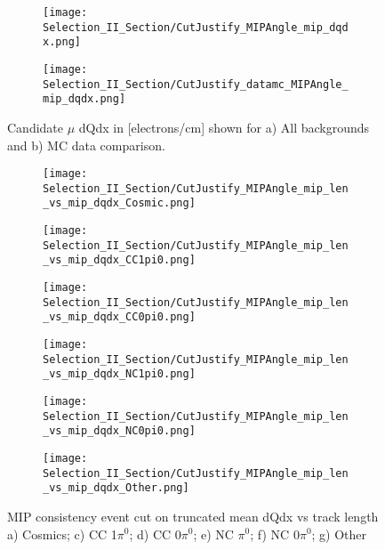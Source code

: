 \begin{figure}[h!]
\centering
  \begin{subfigure}[t]{0.3\textwidth}
    \centering
\texttt{[image: Selection\_II\_Section/CutJustify\_MIPAngle\_mip\_dqdx.png]}
    \caption{ }
  \end{subfigure} 
  \hspace{20mm}
  \begin{subfigure}[t]{0.3\textwidth}
    \centering
\texttt{[image: Selection\_II\_Section/CutJustify\_datamc\_MIPAngle\_mip\_dqdx.png]}
    \caption{ }
  \end{subfigure} 
\caption{ Candidate $\mu$ dQdx in [electrons/cm] shown for a) All backgrounds and b) MC data comparison. }
\label{fig:cutjust_sel2_multall_dqdx}
\end{figure}

\begin{figure}[t!]
\centering
  \begin{subfigure}[t]{0.35\textwidth}
    \centering
\texttt{[image: Selection\_II\_Section/CutJustify\_MIPAngle\_mip\_len\_vs\_mip\_dqdx\_Cosmic.png]}
    \caption{ }
  \end{subfigure} 
  \hspace{3mm}
  \begin{subfigure}[t]{0.35\textwidth}
    \centering
\texttt{[image: Selection\_II\_Section/CutJustify\_MIPAngle\_mip\_len\_vs\_mip\_dqdx\_CC1pi0.png]}
    \caption{ }
  \end{subfigure} 
  \hspace{3mm}
  \begin{subfigure}[t]{0.35\textwidth}
    \centering
\texttt{[image: Selection\_II\_Section/CutJustify\_MIPAngle\_mip\_len\_vs\_mip\_dqdx\_CC0pi0.png]}
    \caption{ }
  \end{subfigure} 
    \hspace{3mm}
  \begin{subfigure}[t]{0.35\textwidth}
    \centering
\texttt{[image: Selection\_II\_Section/CutJustify\_MIPAngle\_mip\_len\_vs\_mip\_dqdx\_NC1pi0.png]}
    \caption{ }
  \end{subfigure} 
  \hspace{3mm}
  \begin{subfigure}[t]{0.35\textwidth}
    \centering
\texttt{[image: Selection\_II\_Section/CutJustify\_MIPAngle\_mip\_len\_vs\_mip\_dqdx\_NC0pi0.png]}
    \caption{ }
  \end{subfigure}
    \hspace{3mm}
  \begin{subfigure}[t]{0.35\textwidth}
    \centering
\texttt{[image: Selection\_II\_Section/CutJustify\_MIPAngle\_mip\_len\_vs\_mip\_dqdx\_Other.png]}
    \caption{ }
  \end{subfigure} 
\caption{ MIP consistency event cut on truncated mean dQdx vs track length a) Cosmics; c) CC 1$\pi^0$; d) CC 0$\pi^0$; e) NC $\pi^0$; f) NC 0$\pi^0$; g) Other }
\label{fig:cutjust_mip_2d}
\end{figure}

